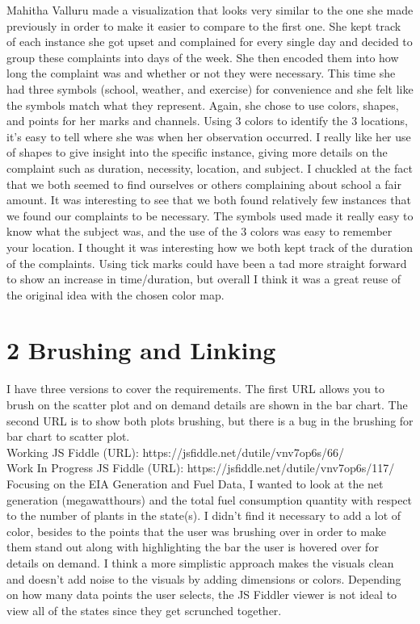 \documentclass{neu_handout}
\begin{document}
Mahitha Valluru made a visualization that looks very similar to the one she made previously in order to make it easier to compare to the first one. She kept track of each instance she got upset and complained for every single day and decided to group these complaints into days of the week. She then encoded them into how long the complaint was and whether or not they were necessary. This time she had three symbols (school, weather, and exercise) for convenience and she felt like the symbols match what they represent. Again, she chose to use colors, shapes, and points for her marks and channels. Using 3 colors to identify the 3 locations, it’s easy to tell where she was when her observation occurred. I really like her use of shapes to give insight into the specific instance, giving more details on the complaint such as duration, necessity, location, and subject. I chuckled at the fact that we both seemed to find ourselves or others complaining about school a fair amount. It was interesting to see that we both found relatively few instances that we found our complaints to be necessary. The symbols used made it really easy to know what the subject was, and the use of the 3 colors was easy to remember your location. I thought it was interesting how we both kept track of the duration of the complaints. Using tick marks could have been a tad more straight forward to show an increase in time/duration, but overall I think it was a great reuse of the original idea with the chosen color map.


\section*{2 Brushing and Linking}

I have three versions to cover the requirements. The first URL allows you to brush on the scatter plot and on demand details are shown in the bar chart. The second URL is to show both plots brushing, but there is a bug in the brushing for bar chart to scatter plot.\\

Working JS Fiddle (URL): https://jsfiddle.net/dutile/vnv7op6s/66/\\
Work In Progress JS Fiddle (URL): https://jsfiddle.net/dutile/vnv7op6s/117/ \\

Focusing on the EIA Generation and Fuel Data, I wanted to look at the net generation (megawatthours) and the total fuel consumption quantity with respect to the number of plants in the state(s). I didn't find it necessary to add a lot of color, besides to the points that the user was brushing over in order to make them stand out along with highlighting the bar the user is hovered over for details on demand. I think a more simplistic approach makes the visuals clean and doesn't add noise to the visuals by adding dimensions or colors. Depending on how many data points the user selects, the JS Fiddler viewer is not ideal to view all of the states since they get scrunched together.
\end{document}
